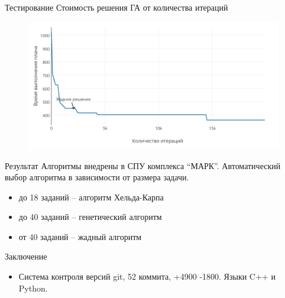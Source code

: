 \documentclass{beamer}
\begin{document}
\begin{frame}{Тестирование}
Стоимость решения ГА от количества итераций
\begin{figure}[t]
    \includegraphics[scale=0.6]{images/iter-value-20-plot.png}
\end{figure}

\end{frame}

\begin{frame}{Результат}
Алгоритмы внедрены в СПУ комплекса ``МАРК''.
\linebreak
\linebreak
Автоматический выбор алгоритма в зависимости от размера задачи.
\begin{itemize}
\item до 18 заданий -- алгоритм Хельда-Карпа
\item до 40 заданий -- генетический алгоритм
\item от 40 заданий -- жадный алгоритм
\end{itemize}
\end{frame}

\begin{frame}{Заключение}
\begin{itemize}
\item Система контроля версий git, 52 коммита, +4900 -1800. Языки C++ и Python.
\end{itemize}

\end{frame}
\end{document}
